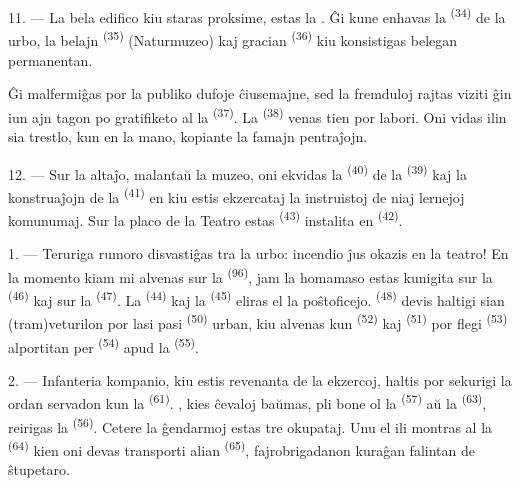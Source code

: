 \VUsaut{4.0mm}
\VUsaut{3.4mm}

11. --- La bela edifico kiu staras proksime, estas la . Ĝi kune
enhavas la  \textsuperscript{(34)} de la urbo, la belajn
 \textsuperscript{(35)} (Naturmuzeo) kaj
gracian  \textsuperscript{(36)} kiu konsistigas belegan
 permanentan.

Ĝi malfermiĝas por la publiko dufoje ĉiusemajne, sed la fremduloj rajtas
viziti ĝin iun ajn tagon po gratifiketo al la 
\textsuperscript{(37)}. La  \textsuperscript{(38)} venas tien
por labori. Oni vidas ilin  sia trestlo, kun  en
la mano, kopiante la famajn pentraĵojn.

12. --- Sur la altaĵo, malantaŭ la muzeo, oni ekvidas la 
\textsuperscript{(40)} de la  \textsuperscript{(39)} kaj la
konstruaĵojn de la  \textsuperscript{(41)} en kiu estis
ekzercataj la instruistoj de niaj lernejoj komunumaj. Sur la placo de la Teatro
estas  \textsuperscript{(43)} instalita en  \textsuperscript{(42)}.

\VUsaut{5.0mm}
\VUsaut{3.0mm}

\VUsaut{3.4mm}

1. --- Teruriga rumoro disvastiĝas tra la urbo: incendio ĵus okazis en la
teatro! En la momento kiam mi alvenas sur la 
\textsuperscript{(96)}, jam la homamaso estas kunigita sur la
 \textsuperscript{(46)} kaj sur la 
\textsuperscript{(47)}. La  \textsuperscript{(44)} kaj la
 \textsuperscript{(45)} eliras el la poŝtoficejo.
 \textsuperscript{(48)} devis haltigi sian (tram)veturilon
por lasi pasi  \textsuperscript{(50)} urban, kiu
alvenas kun  \textsuperscript{(52)} kaj 
\textsuperscript{(51)} por flegi  \textsuperscript{(53)}
alportitan per  \textsuperscript{(54)} apud la
 \textsuperscript{(55)}.

2. --- Infanteria kompanio, kiu estis revenanta de la ekzercoj, haltis por
sekurigi la ordan servadon kun la 
\textsuperscript{(61)}. , kies ĉevaloj baŭmas, pli bone ol
la  \textsuperscript{(57)} aŭ la 
\textsuperscript{(63)}, reirigas la 
\textsuperscript{(56)}. Cetere la ĝendarmoj estas tre okupataj. Unu el ili
montras al la  \textsuperscript{(64)} kien oni devas
transporti alian  \textsuperscript{(65)}, fajrobrigadanon
kuraĝan falintan de ŝtupetaro.


